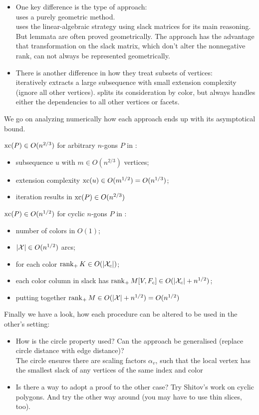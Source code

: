 \begin{itemize}
  \item One key difference is the type of approach:\\
  \cite{shitov2020sublinear} uses a purely geometric method.\\
  \cite{kwan2020extension} uses the linear-algebraic strategy using slack matrices for its main reasoning. But lemmata are often proved geometrically. The approach has the advantage that transformation on the slack matrix, which don't alter the nonnegative rank, can not always be represented geometrically.

  \item There is another difference in how they treat subsets of vertices:\\
  \cite{shitov2020sublinear} iteratively extracts a large subsequence with small extension complexity (ignore all other vertices).
  \cite{kwan2020extension} splits its consideration by color, but always handles either the dependencies to all other vertices or facets. 
\end{itemize}

We go on analyzing numerically how each approach ends up with its asymptotical bound.

$\operatorname{xc}(P) \in O(n^{2/3})$ for arbitrary $n$-gons $P$ in \cite{shitov2020sublinear}:
\begin{itemize}
  \item subsequence $u$ with $m \in O(n^{2/3})$ vertices;
  \item extension complexity $\operatorname{xc}(u) \in O(m^{1/2}) = O(n^{1/3})$;
  \item iteration results in $\operatorname{xc}(P) \in O(n^{2/3})$
\end{itemize}

$\operatorname{xc}(P) \in O(n^{1/2})$ for cyclic $n$-gons $P$ in \cite{kwan2020extension}:
\begin{itemize}
  \item number of colors in $O(1)$;
  \item $\lvert\mathcal{X}\rvert \in O(n^{1/2})$ arcs;
  \item for each color $\operatorname{rank}_+ K \in O(\lvert\mathcal{X}_c\rvert)$;
  \item each color column in slack has $\operatorname{rank}_+ M[V,F_c] \in O(\lvert\mathcal{X}_c\rvert + n^{1/2})$;
  \item putting together $\operatorname{rank}_+ M \in O(\lvert\mathcal{X}\rvert + n^{1/2}) = O(n^{1/2})$
\end{itemize}

Finally we have a look, how each procedure can be altered to be used in the other's setting:
\begin{itemize}
  \item How is the circle property used? Can the approach be generalised (replace circle distance with edge distance)?\\
  The circle ensures there are scaling factors $\alpha_v$, such that the local vertex has the smallest slack of any vertices of the same index and color
  \item Is there a way to adopt a proof to the other case? Try Shitov's work on cyclic polygons. And try the other way around (you may have to use thin slices, too).
\end{itemize}
